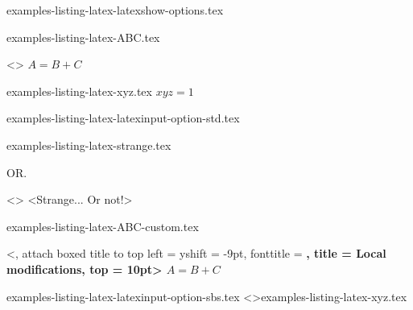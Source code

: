 \begin{filecontents*}[overwrite]{examples-listing-latex-latexshow-options.tex}
\end{filecontents*}


\begin{filecontents*}[overwrite]{examples-listing-latex-ABC.tex}
\begin{tdoclatex}<>
$A = B + C$
\end{tdoclatex}
\end{filecontents*}


\begin{filecontents*}[overwrite]{examples-listing-latex-xyz.tex}
$x y z = 1$
\end{filecontents*}


\begin{filecontents*}[overwrite]{examples-listing-latex-latexinput-option-std.tex}
\end{filecontents*}


\begin{filecontents*}[overwrite]{examples-listing-latex-strange.tex}
\begin{tdoclatex}
\end{tdoclatex}
OR.
\begin{tdoclatex}<>
<Strange... Or not!>
\end{tdoclatex}
\end{filecontents*}


\begin{filecontents*}[overwrite]{examples-listing-latex-ABC-custom.tex}
\begin{tdoclatex}%
    [linenos, style = igor, showspaces]%
    <,
     attach boxed title to top left = {yshift = -9pt},
     fonttitle                      = \bfseries,
     title                          = Local modifications,
     top                            = 10pt>
$A = B + C$
\end{tdoclatex}
\end{filecontents*}


\begin{filecontents*}[overwrite]{examples-listing-latex-latexinput-option-sbs.tex}
\tdoclatexinput<>{examples-listing-latex-xyz.tex}
\end{filecontents*}


